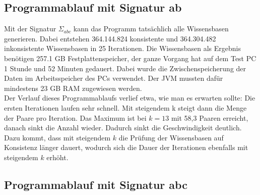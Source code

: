 \documentclass[12pt,a4paper]{article}
\begin{document}
\subsection{Programmablauf mit Signatur ab}
Mit der Signatur $\Sigma_{abc}$ kann das Programm tatsächlich alle Wissensbasen generieren. Dabei entstehen 364.144.824 konsistente und 364.304.482 inkonsistente Wissensbasen in 25 Iterationen. Die Wissensbasen als Ergebnis benötigen 257.1 GB Festplattenspeicher, der ganze Vorgang hat auf dem Test PC 1 Stunde und 52 Minuten gedauert. Dabei wurde die Zwischenspeicherung der Daten im Arbeitsspeicher des PCs verwendet. Der JVM mussten dafür mindestens 23 GB RAM zugewiesen werden. \\
Der Verlauf dieses Programmablaufs verlief etwa, wie man es erwarten sollte: Die ersten Iterationen laufen sehr schnell. Mit steigendem k steigt dann die Menge der Paare pro Iteration. Das Maximum ist bei $k=13$ mit 58,3 Paaren erreicht, danach sinkt die Anzahl wieder. Dadurch sinkt die Geschwindigkeit deutlich. Dazu kommt, dass mit steigendem $k$ die Prüfung der Wissensbasen auf Konsistenz länger dauert, wodurch sich die Dauer der Iterationen ebenfalls mit steigendem $k$ erhöht.


\subsection{Programmablauf mit Signatur abc}
\end{document}
